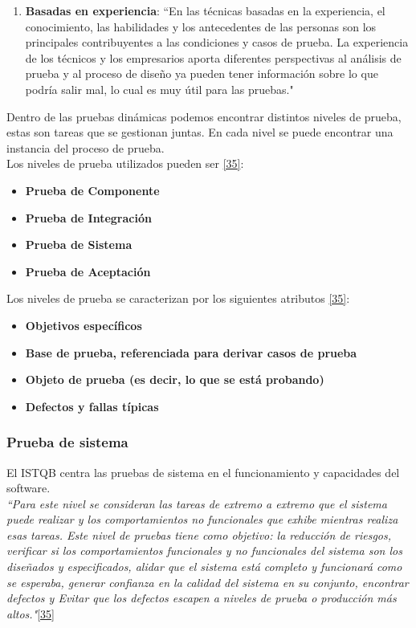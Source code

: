 \begin{enumerate}
	\item \textbf {Basadas en experiencia}: ``En las técnicas basadas en la experiencia, el conocimiento, las habilidades y los antecedentes de las personas son los principales contribuyentes a las condiciones y casos de prueba. La experiencia de los técnicos y los empresarios aporta diferentes perspectivas al análisis de prueba y al proceso de diseño ya pueden tener información sobre lo que podría salir mal, lo cual es muy útil para las pruebas."

\end{enumerate}

Dentro de las pruebas dinámicas podemos encontrar distintos niveles de prueba, estas son tareas que se gestionan juntas. En cada nivel se puede encontrar una instancia del proceso de prueba.\\

Los niveles de prueba utilizados pueden ser \hyperlink{b35}{[35]}: 

\begin{itemize}
	\item \textbf {Prueba de Componente}
	\item \textbf {Prueba de Integración}
	\item \textbf {Prueba de Sistema}
	\item \textbf {Prueba de Aceptación}
\end{itemize}

Los niveles de prueba se caracterizan por los siguientes atributos \hyperlink{b35}{[35]}: 

\begin{itemize}
	\item \textbf {Objetivos específicos}
	\item \textbf {Base de prueba, referenciada para derivar casos de prueba}
	\item \textbf {Objeto de prueba (es decir, lo que se está probando)}
	\item \textbf {Defectos y fallas típicas}
\end{itemize}

\subsubsection{Prueba de sistema}

El ISTQB centra las pruebas de sistema en el funcionamiento y capacidades del software.\\

 	\textit {``Para este nivel se consideran las tareas de extremo a extremo que el sistema puede realizar y los comportamientos no funcionales que exhibe mientras realiza esas tareas. Este nivel de pruebas tiene como objetivo: la reducción de riesgos, verificar si los comportamientos funcionales y no funcionales del sistema son los diseñados y especificados, alidar que el sistema está completo y funcionará como se esperaba, generar confianza en la calidad del sistema en su conjunto, encontrar defectos y Evitar que los defectos escapen a niveles de prueba o producción más altos."}\hyperlink{b35}{[35]} \\
 	
